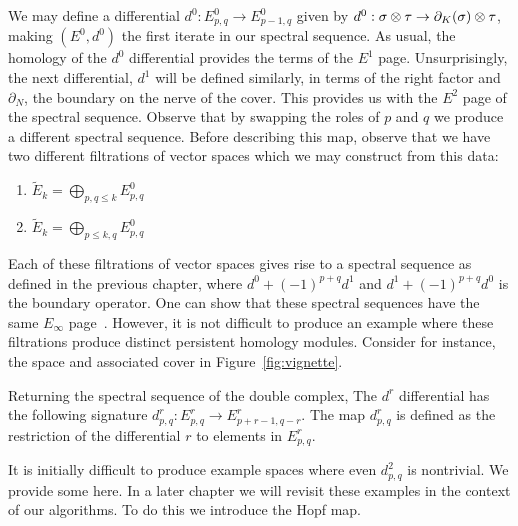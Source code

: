 We may define a differential $d^0: E^0_{p,q} \rightarrow E^0_{p-1,q}$ given by $d^0: \sigma \otimes \tau \rightarrow \partial_K(\sigma) \otimes \tau$, making $(E^0, d^0)$ the first iterate in our spectral sequence. As usual, the homology of the $d^0$ differential provides the terms of the $E^1$ page. Unsurprisingly, the next differential, $d^1$ will be defined similarly, in terms of the right factor and $\partial_N$, the boundary on the nerve of the cover. This provides us with the $E^2$ page of the spectral sequence. Observe that by swapping the roles of $p$ and $q$ we produce a different spectral sequence.
Before describing this map, observe that we have two different filtrations of vector spaces which we may construct from this data: 
\begin{enumerate}
\item $\tilde{E}_k = \bigoplus_{p, q \leq k} E^0_{p,q}$
\item $\tilde{E}_k = \bigoplus_{p \leq k, q} E^0_{p,q}$ 
\end{enumerate}
Each of these filtrations of vector spaces gives rise to a spectral sequence as defined in the previous chapter, where $d^0 + (-1)^{p+q}d^1$ and $d^1 + (-1)^{p+q}d^0$ is the boundary operator. One can show that these spectral sequences have the same $E_\infty$ page~\cite{mcleary}. However, it is not difficult to produce an example where these filtrations produce distinct persistent homology modules. Consider for instance, the space and associated cover in Figure~\ref{fig:vignette}. 

Returning the spectral sequence of the double complex, The $d^r$ differential has the following signature $d^r_{p,q}: E^r_{p,q} \rightarrow E^r_{p+r-1, q-r}$. The map $d^r_{p,q}$ is defined as the restriction of the differential $r$ to elements in $E^r_{p,q}$. 

It is initially difficult to produce example spaces where even $d^2_{p,q}$ is nontrivial. We provide some here. In a later chapter we will revisit these examples in the context of our algorithms. To do this we introduce the Hopf map.

\begin{example}
\end{example}

